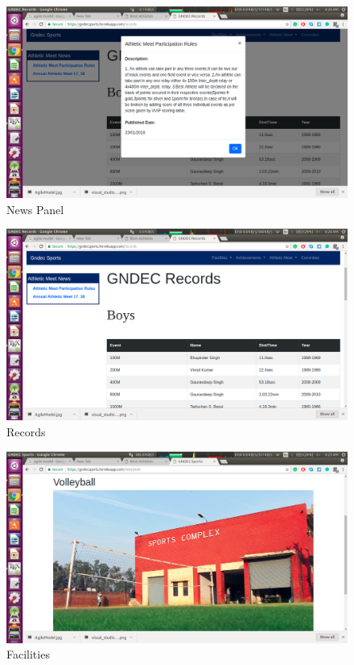 \newpage

\begin{figure}[ht]
\centering
\includegraphics[scale=0.35]{images/NewsPanelHeroku.png}
\caption{News Panel}
\end{figure}

\newpage

\begin{figure}[ht]
\centering
\includegraphics[scale=0.35]{images/RecordsHeroku.png}
\caption{Records}
\end{figure}

\newpage

\begin{figure}[ht]
\centering
\includegraphics[scale=0.35]{images/VollyballHeroku.png}
\caption{Facilities}
\end{figure}

